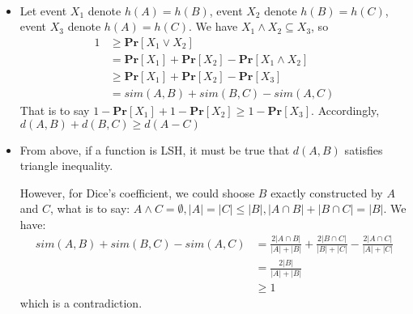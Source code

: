 \documentclass[12pt]{article}
\newenvironment{solution}[2][Solution]{\begin{trivlist}
\item[\hskip \labelsep {\bfseries #1}\hskip \labelsep {\bfseries #2.}]}{\end{trivlist}}
\begin{document}
\begin{solution}{3}
    ~
    \begin{itemize}
        \item Let event $X_1$ denote $h(A) = h(B)$, event $X_2$ denote $h(B) = h(C)$, event $X_3$ denote $h(A) = h(C)$. We have $X_1 \land X_2 \subseteq X_3$, so
              \begin{align*}
                  1 & \ge \mathbf{Pr}[X_1 \lor X_2]                                      \\
                    & = \mathbf{Pr}[X_1] + \mathbf{Pr}[X_2] - \mathbf{Pr}[X_1 \land X_2] \\
                    & \ge \mathbf{Pr}[X_1] + \mathbf{Pr}[X_2] - \mathbf{Pr}[X_3]         \\
                    & = sim(A, B) + sim(B, C) - sim(A, C)
              \end{align*}
              That is to say $1-\mathbf{Pr}[X_1]+1-\mathbf{Pr}[X_2] \ge 1-\mathbf{Pr}[X_3]$. Accordingly, $d(A, B) + d(B, C) \ge d(A-C)$
        \item From above, if a function is LSH, it must be true that $d(A,B)$ satisfies triangle inequality.

              However, for Dice's coefficient, we could shoose $B$ exactly constructed by $A$ and $C$, what is to say: $A \land C = \emptyset, |A|=|C| \le |B|, |A \cap B| + |B \cap C| = |B|$.
              We have:
              \begin{align*}
                  sim(A, B) + sim(B, C) - sim(A, C) & = \frac{2|A \cap B|}{|A|+|B|} + \frac{2|B \cap C|}{|B|+|C|} - \frac{2|A \cap C|}{|A|+|C|} \\
                                                    & = \frac{2|B|}{|A|+|B|}                                                                    \\
                                                    & \ge 1
              \end{align*}
              which is a contradiction.


\end{itemize}
\end{solution}
\end{document}

